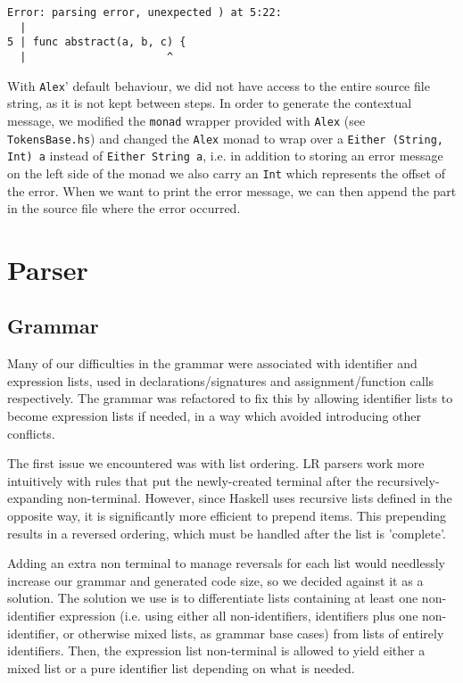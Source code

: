 \documentclass[11pt]{article}
\begin{document}
\begin{verbatim}
Error: parsing error, unexpected ) at 5:22:
  |
5 | func abstract(a, b, c) {
  |                      ^
\end{verbatim}

With \texttt{Alex}' default behaviour, we did not have access to the entire
source file string, as it is not kept between steps. In order to
generate the contextual message, we modified the \texttt{monad} wrapper
provided with \texttt{Alex} (see \texttt{TokensBase.hs}) and changed the \texttt{Alex}
monad to wrap over a \texttt{Either (String, Int) a} instead of
\texttt{Either String a}, i.e. in addition to storing an error message on
the left side of the monad we also carry an \texttt{Int} which represents
the offset of the error. When we want to print the error
message, we can then append the part in the source file where
the error occurred.
\section{Parser}
\label{sec:org80fc7ec}
\subsection{Grammar}
\label{sec:orgf1b94d1}
Many of our difficulties in the grammar were associated with identifier and
expression lists, used in declarations/signatures and assignment/function
calls respectively. The grammar was refactored to fix this by allowing
identifier lists to become expression lists if needed, in a way which
avoided introducing other conflicts.

The first issue we encountered was with list ordering. LR parsers
work more intuitively with rules that put the newly-created terminal
after the recursively-expanding non-terminal. However, since Haskell
uses recursive lists defined in the opposite way, it is significantly
more efficient to prepend items. This prepending results in a reversed
ordering, which must be handled after the list is 'complete'.

Adding an extra non terminal to manage reversals for each list would
needlessly increase our grammar and generated code size, so we decided
against it as a solution. The solution we use is to differentiate
lists containing at least one non-identifier expression (i.e. using either
all non-identifiers, identifiers plus one non-identifier, or otherwise mixed
lists, as grammar base cases) from lists of entirely identifiers. Then,
the expression list non-terminal is allowed to yield either a mixed list
or a pure identifier list depending on what is needed.
\end{document}
